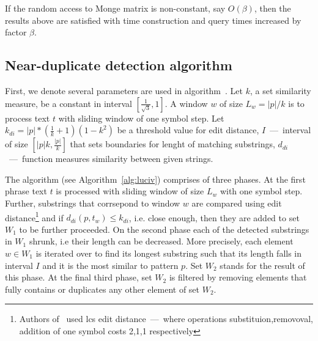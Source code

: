 If the random access to Monge matrix is non-constant, say $O(\beta)$, then the results above are satisfied with time construction and query times increased by factor $\beta$.
  

\subsection{Near-duplicate detection algorithm}
\label{sec:lucivalgo}
First, we denote several parameters are used in algorithm~\cite{.}.
Let $k$, a set similarity measure, be a constant in interval $[\frac{1}{\sqrt{3}},1]$.
A window $w$ of size $L_{w} = |p|/k$ is to process text $t$ with sliding window of one symbol step.
Let $k_{di} = |p|*(\frac{1}{k}+1)(1-k^2)$ be a threshold value for edit distance,
$I$~---~interval of size $[|p|k,\frac{|p|}{k}]$ that sets boundaries for lenght of matching substrings,
$d_{di}$~---~function measures similarity between given strings.

The algorithm (see Algorithm~\ref{alg:luciv}) comprises of three phases.
At the first phrase text $t$ is processed with sliding window of size $L_{w}$ with one symbol step.
Further, substrings that corrsepond to window $w$ are compared using edit distance\footnote{
  Authors of~\cite{.} used lcs edit distance~---~where  operations substituion,removoval, addition of one symbol costs 2,1,1 respectively}
and if $d_{di}(p,t_{w}) \leq k_{di}$, i.e. close enough, then they are added to set $W_{1}$ to be further proceeded. 
On the second phase each of the detected substrings in $W_{1}$ shrunk, i.e their length can be decreased.
More precisely, each element $w \in W_{1}$ is iterated over to find its longest substring such that its length falls in interval $I$ and it is the most similar to pattern $p$.
Set $W_2$ stands for the result of this phase.
At the final third phase, set $W_{2}$ is filtered by removing elements that fully contains or duplicates any other element of set $W_{2}$.

